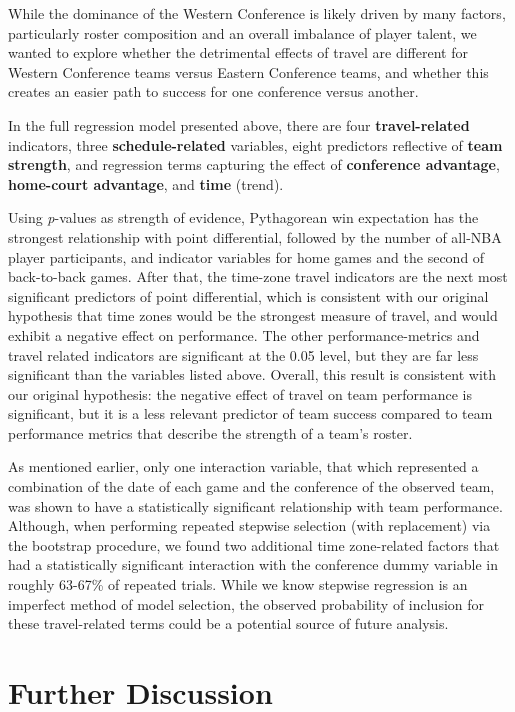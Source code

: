 \documentclass[
    12pt,
    a4paper,
    titlepage,  %
    abstract,  %
    headings=standardclasses,  %
    bibliography=totocnumbered  %
]{scrartcl}
\begin{document}
While the dominance of the Western Conference is likely driven by many factors, particularly roster composition and an overall imbalance of player talent, we wanted to explore whether the detrimental effects of travel are different for Western Conference teams versus Eastern Conference teams, and whether this creates an easier path to success for one conference versus another. 

In the full regression model presented above, there are four \textbf{travel-related} indicators, three \textbf{schedule-related} variables, eight predictors reflective of \textbf{team strength}, and regression terms capturing the effect of \textbf{conference advantage}, \textbf{home-court advantage}, and \textbf{time} (trend).

Using \emph{p}-values as strength of evidence, Pythagorean win expectation has the strongest relationship with point differential, followed by the number of all-NBA player participants, and indicator variables for home games and the second of back-to-back games. After that, the time-zone travel indicators are the next most significant predictors of point differential, which is consistent with our original hypothesis that time zones would be the strongest measure of travel, and would exhibit a negative effect on performance. The other performance-metrics and travel related indicators are significant at the 0.05 level, but they are far less significant than the variables listed above. Overall, this result is consistent with our original hypothesis: the negative effect of travel on team performance is significant, but it is a less relevant predictor of team success compared to team performance metrics that describe the strength of a team's roster.

As mentioned earlier, only one interaction variable, that which represented a combination of the date of each game and the conference of the observed team, was shown to have a statistically significant relationship with team performance. Although, when performing repeated stepwise selection (with replacement) via the bootstrap procedure, we found two additional time zone-related factors that had a statistically significant interaction with the conference dummy variable in roughly 63-67\% of repeated trials. While we know stepwise regression is an imperfect method of model selection, the observed probability of inclusion for these travel-related terms could be a potential source of future analysis.

\section{Further Discussion}
\end{document}
